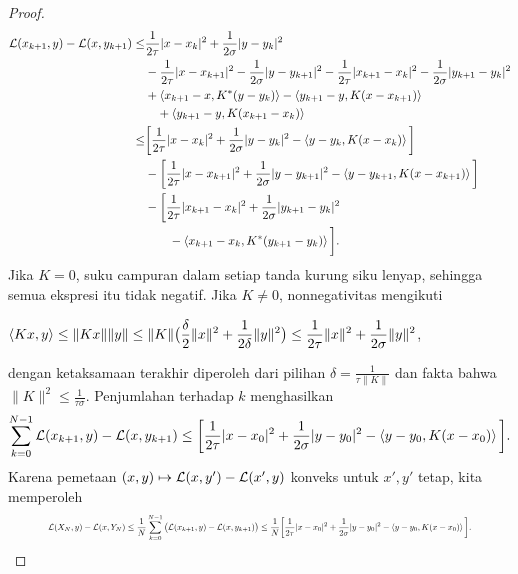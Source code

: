 \begin{proof}
    {\small
    \begin{equation}
        \begin{aligned}
            \mathcal{L}(x_{k+1},y) - \mathcal{L}(x,y_{k+1})
            \leq& \frac{1}{2\tau}|x-x_k|^2 + \frac{1}{2\sigma}|y-y_k|^2\\
            &-\frac{1}{2\tau}|x-x_{k+1}|^2 - \frac{1}{2\sigma}|y-y_{k+1}|^2
            -\frac{1}{2\tau}|x_{k+1}-x_k|^2 - \frac{1}{2\sigma}|y_{k+1}-y_k|^2\\
            &+\left\langle x_{k+1}-x , K^*(y-y_k)\right\rangle  - \left\langle y_{k+1}-y , K(x-x_{k+1})\right\rangle\\
            &\quad + \left\langle y_{k+1}-y , K(x_{k+1}-x_k)\right\rangle\\
            \leq& \bigg[\frac{1}{2\tau}|x-x_k|^2 + \frac{1}{2\sigma}|y-y_k|^2 - \left\langle y-y_k , K(x-x_{k})\right\rangle\bigg]\\
            &-\bigg[\frac{1}{2\tau}|x-x_{k+1}|^2 + \frac{1}{2\sigma}|y-y_{k+1}|^2 - \left\langle y-y_{k+1} , K(x-x_{k+1})\right\rangle\bigg]\\
            &-\bigg[ \frac{1}{2\tau}|x_{k+1}-x_k|^2 + \frac{1}{2\sigma}|y_{k+1}-y_k|^2\\
            &\qquad - \left\langle x_{k+1}-x_k , K^*(y_{k+1}-y_{k})\right\rangle\bigg].
        \end{aligned}
    \end{equation}
    }
    Jika $K=0$, suku campuran dalam setiap tanda kurung siku lenyap, sehingga semua ekspresi itu tidak negatif. Jika $K\neq0$, nonnegativitas mengikuti
    \par\smallskip
    {\centering\small
    $\displaystyle \left\langle Kx , y\right\rangle\leq \|Kx\|\|y\|\leq\|K\| \big(\frac{\delta}{2}\|x\|^2 + \frac{1}{2\delta}\|y\|^2\big)\leq \frac{1}{2\tau}\|x\|^2 + \frac{1}{2\sigma}\|y\|^2$,
    \par}
    \smallskip
    dengan ketaksamaan terakhir diperoleh dari pilihan $\delta = \frac{1}{\tau\|K\|}$ dan fakta bahwa $\|K\|^2\leq \frac{1}{\tau\sigma}$.
    Penjumlahan terhadap $k$ menghasilkan
    \begin{equation}
        \sum_{k=0}^{N-1} \mathcal{L}(x_{k+1},y) - \mathcal{L}(x,y_{k+1}) \leq \bigg[\frac{1}{2\tau}|x-x_0|^2 + \frac{1}{2\sigma}|y-y_0|^2 - \left\langle y-y_0 , K(x-x_{0})\right\rangle\bigg].
    \end{equation}
    Karena pemetaan $(x,y)\mapsto \mathcal{L}(x,y') - \mathcal{L}(x',y)$ konveks untuk $x',y'$ tetap, kita memperoleh
    \begin{equation}
        \resizebox{0.88\linewidth}{!}{$\displaystyle
        \Lc(X_{N},y) - \Lc(x,Y_{N})\leq \frac{1}{N}\sum_{k=0}^{N-1} \big(\Lc(x_{k+1},y) - \Lc(x,y_{k+1})\big) \leq \frac{1}{N}\bigg[\frac{1}{2\tau}|x-x_0|^2 + \frac{1}{2\sigma}|y-y_0|^2 - \inner{y-y_0}{K(x-x_{0})}\bigg].
        $}
    \end{equation}
\end{proof}

